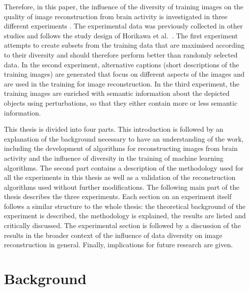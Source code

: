 Therefore, in this paper, the influence of the diversity of training images on the quality of image reconstruction from brain activity is investigated in three different experiments . The experimental data was previously collected in other studies and follows the study design of Horikawa et al.~\cite{horikawaGenericDecodingSeen2017}. The first experiment attempts to create subsets from the training data that are maximised according to their diversity and should therefore perform better than randomly selected data. In the second experiment, alternative captions (short descriptions of the training images) are generated that focus on different aspects of the images and are used in the training for image reconstruction. In the third experiment, the training images are enriched with semantic information about the depicted objects using perturbations, so that they either contain more or less semantic information.

This thesis is divided into four parts. This introduction is followed by an explanation of the background necessary to have an understanding of the work, including the development of algorithms for reconstructing images from brain activity and the influence of diversity in the training of machine learning algorithms. The second part contains a description of the methodology used for all the experiments in this thesis as well as a validation of the reconstruction algorithms used without further modifications. The following main part of the thesis describes the three experiments. Each section on an experiment itself follows a similar structure to the whole thesis: the theoretical background of the experiment is described, the methodology is explained, the results are listed and critically discussed. The experimental section is followed by a discussion of the results in the broader context of the influence of data diversity on image reconstruction in general. Finally, implications for future research are given.


\section{Background}

